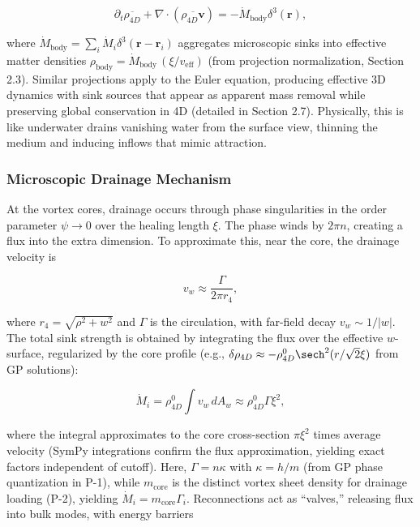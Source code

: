 \[
\partial_t \overline{\rho_{4D}} + \nabla \cdot (\overline{\rho_{4D} \mathbf{v}}) = -\dot{M}_{\text{body}} \delta^3(\mathbf{r}),
\]

where $\dot{M}_{\text{body}} = \sum_i \dot{M}_i \delta^3(\mathbf{r} - \mathbf{r}_i)$ aggregates microscopic sinks into effective matter densities $\rho_{\text{body}} = \dot{M}_{\text{body}} \, (\xi / v_{\text{eff}})$ (from projection normalization, Section 2.3). Similar projections apply to the Euler equation, producing effective 3D dynamics with sink sources that appear as apparent mass removal while preserving global conservation in 4D (detailed in Section 2.7). Physically, this is like underwater drains vanishing water from the surface view, thinning the medium and inducing inflows that mimic attraction.

\subsubsection{Microscopic Drainage Mechanism}
At the vortex cores, drainage occurs through phase singularities in the order parameter $\psi \to 0$ over the healing length $\xi$. The phase winds by $2\pi n$, creating a flux into the extra dimension. To approximate this, near the core, the drainage velocity is

\begin{equation}
v_w \approx \frac{\Gamma}{2\pi r_4},
\end{equation}

where $r_4 = \sqrt{\rho^2 + w^2}$ and $\Gamma$ is the circulation, with far-field decay $v_w \sim 1/|w|$. The total sink strength is obtained by integrating the flux over the effective $w$-surface, regularized by the core profile (e.g., $\delta \rho_{4D} \approx -\rho_{4D}^0 \sech^2(r / \sqrt{2} \xi)$ from GP solutions):

\begin{equation}
\dot{M}_i = \rho_{4D}^0 \int v_w \, dA_w \approx \rho_{4D}^0 \Gamma \xi^2,
\end{equation}

where the integral approximates to the core cross-section $\pi \xi^2$ times average velocity (SymPy integrations confirm the flux approximation, yielding exact factors independent of cutoff). Here, $\Gamma = n \kappa$ with $\kappa = h / m$ (from GP phase quantization in P-1), while $m_{\text{core}}$ is the distinct vortex sheet density for drainage loading (P-2), yielding $\dot{M}_i = m_{\text{core}} \Gamma_i$. Reconnections act as ``valves,'' releasing flux into bulk modes, with energy barriers

